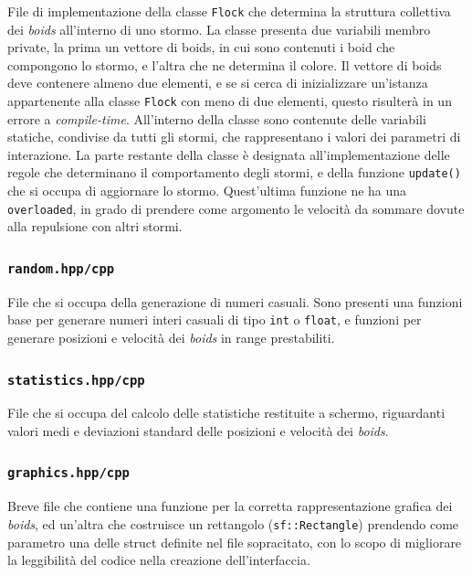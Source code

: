 \documentclass[10pt,a4paper]{article}
\begin{document}
File di implementazione della classe \texttt{Flock} che determina la struttura collettiva dei \textit{boids} all'interno di uno stormo. La classe presenta due variabili membro private, la prima un vettore di boids, in cui sono contenuti i boid che compongono lo stormo, e l'altra che ne determina il colore. Il vettore di boids deve contenere almeno due elementi, e se si cerca di inizializzare un'istanza appartenente alla classe \texttt{Flock} con meno di due elementi, questo risulterà in un errore a \textit{compile-time}. All'interno della classe sono contenute delle variabili statiche, condivise da tutti gli stormi, che rappresentano i valori dei parametri di interazione. La parte restante della classe è designata all'implementazione delle regole che determinano il comportamento degli stormi, e della funzione \texttt{update()} che si occupa di aggiornare lo stormo. Quest'ultima funzione ne ha una \texttt{overloaded}, in grado di prendere come argomento le velocità da sommare dovute alla repulsione con altri stormi.

\subsubsection{\texttt{random.hpp/cpp}}

File che si occupa della generazione di numeri casuali. Sono presenti una funzioni base per generare numeri interi casuali di tipo \texttt{int} o \texttt{float}, e funzioni per generare posizioni e velocità dei \textit{boids} in range prestabiliti.

\subsubsection{\texttt{statistics.hpp/cpp}}

File che si occupa del calcolo delle statistiche restituite a schermo, riguardanti valori medi e deviazioni standard delle posizioni e velocità dei \textit{boids}.

\subsubsection{\texttt{graphics.hpp/cpp}}

Breve file che contiene una funzione per la corretta rappresentazione grafica dei \textit{boids}, ed un'altra che costruisce un rettangolo (\texttt{sf::Rectangle}) prendendo come parametro una delle struct definite nel file sopracitato, con lo scopo di migliorare la leggibilità del codice nella creazione dell'interfaccia.
\end{document}
